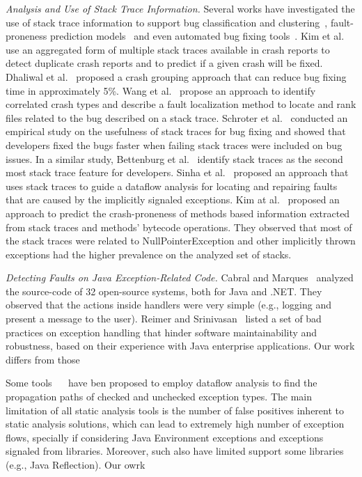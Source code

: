 \documentclass[conference]{IEEEtran}
\begin{document}
\textit{Analysis and Use of Stack Trace Information.} Several works have
investigated the use of stack trace information to support bug classification
and clustering~\cite{wang2013improving, kim2011crash, dhaliwal2011classifying},
fault-proneness prediction models~\cite{kim2013predicting} and even automated
bug fixing tools~\cite{sinha2009fault}. Kim et al.~\cite{kim2011crash} use an
aggregated form of multiple stack traces available in crash reports to detect
duplicate crash reports and to predict if a given crash will be fixed. Dhaliwal
et al.~\cite{dhaliwal2011classifying} proposed a crash grouping approach that
can reduce bug fixing time in approximately 5\%. Wang et
al.~\cite{wang2013improving} propose an approach to identify correlated crash
types and describe a fault localization method to locate and rank files related
to the bug described on a stack trace. Schroter et al.~\cite{schroter2010stack}
conducted an empirical study on the usefulness of stack traces for bug fixing
and showed that developers fixed the bugs faster when failing stack traces were
included on bug issues.  In a similar study, Bettenburg et
al.~\cite{bettenburg2008makes} identify stack traces as the second most stack
trace feature for developers.  Sinha et al.~\cite{sinha2009fault} proposed an
approach that uses stack traces to guide a dataflow analysis for locating and
repairing faults that are caused by the implicitly signaled exceptions. Kim
at al.~\cite{kim2013predicting} proposed an approach to predict the
crash-proneness of methods based information extracted from stack traces and
methods' bytecode operations.  They observed that most of the stack traces were
related to NullPointerException and other implicitly thrown exceptions had
the higher prevalence on the analyzed set of stacks.

\textit{Detecting Faults on Java Exception-Related Code.} 
Cabral and Marques~\cite{cabral2007exception} analyzed the
source-code of 32 open-source systems, both for Java and .NET. They
observed that the actions inside handlers were very simple (e.g., logging and present a
message to the user). Reimer and Srinivasan~\cite{reimer2003analyzing} listed a
set of bad practices on exception handling that hinder software maintainability
and robustness, based on their experience with Java enterprise applications.
Our work differs from those


Some tools ~\cite{Robil00}~\cite{coelho2008assessing} have ben proposed 
to employ dataflow analysis to find the propagation paths of checked and unchecked 
exception types. The main limitation of all static analysis tools is the number of false 
positives inherent to static analysis solutions, which can lead to extremely high number 
of exception flows, specially if considering Java Environment exceptions and exceptions 
signaled from libraries. Moreover, such also have limited support some libraries (e.g., Java Reflection).
Our owrk
\end{document}
